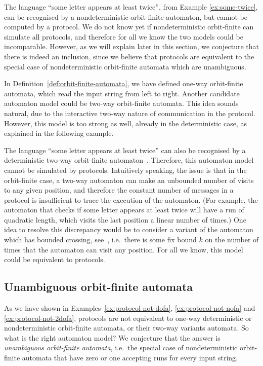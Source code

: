 \begin{myexample}
     \label{ex:protocol-not-nofa}  
    The language ``some letter appears at least twice'', from Example \ref{ex:some-twice}, can be recognised by a nondeterministic orbit-finite automaton, but cannot be computed by a protocol. We do not know yet if nondeterministic orbit-finite can simulate all protocols, and therefore for all we know the two models could be incomparable. However, as we will explain later in this section, we conjecture that there is indeed an inclusion, since we believe that protocols are equivalent to the special case of nondeterministic orbit-finite automata which are unambiguous.
\end{myexample}

In Definition~\ref{def:orbit-finite-automata}, we have defined one-way orbit-finite automata, which read the input string from left to right.
Another candidate automaton model could be two-way orbit-finite automata. This idea sounds natural, due to the interactive two-way nature of communication in the protocol. However, this model is too strong as well,  already in the deterministic case, as explained in the following example. 

\begin{myexample}\label{ex:protocol-not-2dofa}
    The language ``some letter appears at least twice'' can also be recognised by a deterministic two-way orbit-finite automaton~\cite[Example 18]{bojanczyk_slightly}. Therefore, this automaton model cannot be simulated by protocols. Intuitively speaking, the issue is that in the orbit-finite case, a two-way automaton can make an unbounded number of visits to any given position, and therefore the constant number of messages in a protocol is insufficient to trace the execution of the automaton.  (For example, the automaton that checks if some letter appears at least twice will have a run of quadratic length, which visits the last position a linear number of times.) One idea to resolve this discrepancy would be to consider a variant of the automaton which has bounded crossing, see~\cite[p.~92]{neven2003power}, i.e.~there is some fix bound $k$ on the number of times that the automaton can visit any position. For all we know, this model could be equivalent to protocols.
\end{myexample}

\subsection{Unambiguous orbit-finite automata}
\label{sec:unambiguous-orbit-finite-automata}
As we have shown in Examples~\ref{ex:protocol-not-dofa}, \ref{ex:protocol-not-nofa} and \ref{ex:protocol-not-2dofa}, protocols are not equivalent to one-way deterministic or nondeterministic orbit-finite automata, or their two-way variants automata. So what is the right automaton model?  We conjecture that the answer is  \emph{unambiguous orbit-finite automata}, i.e.~the special case of nondeterministic orbit-finite automata that have zero or one accepting runs for every input string.

